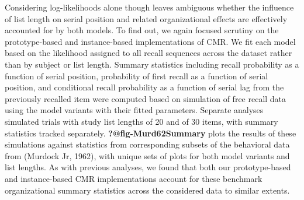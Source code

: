 \documentclass[
  letterpaper,
]{article}
\begin{document}
Considering log-likelihoods alone though leaves ambiguous whether the
influence of list length on serial position and related organizational
effects are effectively accounted for by both models. To find out, we
again focused scrutiny on the prototype-based and instance-based
implementations of CMR. We fit each model based on the likelihood
assigned to all recall sequences across the dataset rather than by
subject or list length. Summary statistics including recall probability
as a function of serial position, probability of first recall as a
function of serial position, and conditional recall probability as a
function of serial lag from the previously recalled item were computed
based on simulation of free recall data using the model variants with
their fitted parameters. Separate analyses simulated trials with study
list lengths of 20 and of 30 items, with summary statistics tracked
separately. \textbf{?@fig-Murd62Summary} plots the results of these
simulations against statistics from corresponding subsets of the
behavioral data from (Murdock Jr, 1962), with unique sets of plots for
both model variants and list lengths. As with previous analyses, we
found that both our prototype-based and instance-based CMR
implementations account for these benchmark organizational summary
statistics across the considered data to similar extents.
\end{document}
